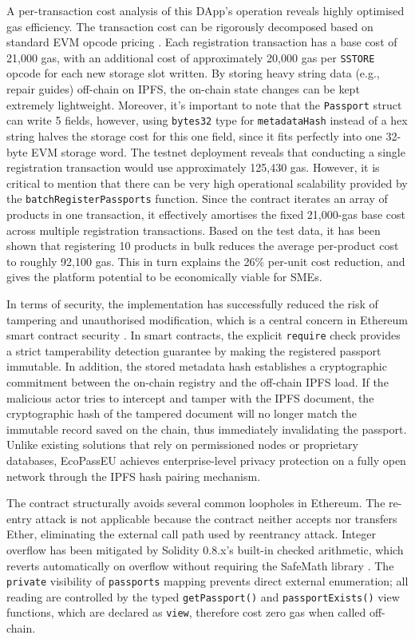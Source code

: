 \documentclass[runningheads]{llncs}
\begin{document}
	A per-transaction cost analysis of this DApp's operation reveals highly 
	optimised gas efficiency. The transaction cost can be rigorously decomposed based on standard EVM opcode pricing \cite{Wood2014Ethereum}. Each registration transaction has a base cost of 21,000 gas, with an additional cost of approximately 20,000 gas per \texttt{SSTORE} opcode for each new storage slot written. By storing heavy string data (e.g., repair guides) off-chain on IPFS, the on-chain state changes can be kept extremely lightweight. Moreover, it's important to note that the \texttt{Passport} struct can write 5 fields, however, using \texttt{bytes32} type for \texttt{metadataHash} instead of a hex string halves the storage cost for this one field, since it fits perfectly into one 32-byte EVM storage word. The testnet deployment reveals that conducting a single registration 
	transaction would use approximately 125,430 gas. However, it is critical to mention that there can be very high operational scalability provided by the \texttt{batchRegisterPassports} function. Since the contract iterates an array of products in one transaction, it effectively amortises the fixed 21,000-gas base cost across multiple registration transactions. Based on the test data, it has been shown that registering 10 products in bulk reduces the average per-product cost to roughly 92,100 gas. This in turn explains the 26\% per-unit cost reduction, and gives the platform potential to be economically viable for SMEs.
	
	In terms of security, the implementation has successfully reduced the risk of tampering and unauthorised modification, which is a central concern in Ethereum smart contract security \cite{Luu2016Making,Tsankov2018Securify}. In smart contracts, the explicit \texttt{require} check provides a strict tamperability detection guarantee by making the registered passport immutable. In addition, the stored metadata hash establishes a cryptographic commitment between the on-chain registry and the off-chain IPFS load. If the malicious actor tries to intercept and tamper with the IPFS document, the cryptographic hash of the tampered document will no longer match the immutable record saved on the chain, thus immediately invalidating the passport. Unlike existing solutions that rely on permissioned nodes or proprietary databases, EcoPassEU achieves enterprise-level privacy protection on a fully open network through the IPFS hash pairing mechanism.

	The contract structurally avoids several common loopholes in Ethereum. 
	The re-entry attack \cite{Luu2016Making} is not applicable because the contract neither accepts nor transfers Ether, eliminating the external call path used by reentrancy attack. 
	Integer overflow has been mitigated by Solidity 0.8.x's 
	built-in checked arithmetic, which reverts automatically on 
	overflow without requiring the SafeMath library 
	\cite{SolidityDocs2024}.
	The \texttt{private} visibility of \texttt{passports} mapping prevents direct external enumeration; all reading are controlled by the typed \texttt{getPassport()} and \texttt{passportExists()} view functions, which are declared as \texttt{view}, therefore cost zero gas when called off-chain.
	
\end{document}
